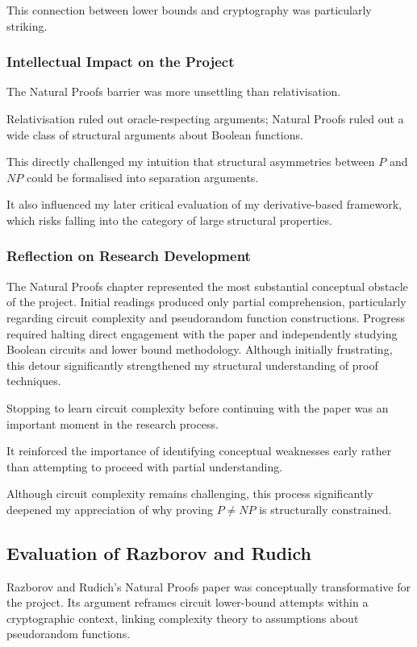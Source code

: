 \documentclass[12pt]{article}
\begin{document}
This connection between lower bounds and cryptography was particularly striking.

\subsubsection*{Intellectual Impact on the Project}

The Natural Proofs barrier was more unsettling than relativisation.

Relativisation ruled out oracle-respecting arguments; Natural Proofs ruled out a wide class of structural arguments about Boolean functions.

This directly challenged my intuition that structural asymmetries between $P$ and $NP$ could be formalised into separation arguments.

It also influenced my later critical evaluation of my derivative-based framework, which risks falling into the category of large structural properties.

\subsubsection*{Reflection on Research Development}

The Natural Proofs chapter represented the most substantial conceptual obstacle of the project. Initial readings produced only partial comprehension, particularly regarding circuit complexity and pseudorandom function constructions. Progress required halting direct engagement with the paper and independently studying Boolean circuits and lower bound methodology. Although initially frustrating, this detour significantly strengthened my structural understanding of proof techniques.

Stopping to learn circuit complexity before continuing with the paper was an important moment in the research process.

It reinforced the importance of identifying conceptual weaknesses early rather than attempting to proceed with partial understanding.

Although circuit complexity remains challenging, this process significantly deepened my appreciation of why proving $P \neq NP$ is structurally constrained.

\subsection{Evaluation of Razborov and Rudich}

Razborov and Rudich's Natural Proofs paper was conceptually transformative for the project. Its argument reframes circuit lower-bound attempts within a cryptographic context, linking complexity theory to assumptions about pseudorandom functions.
\end{document}
